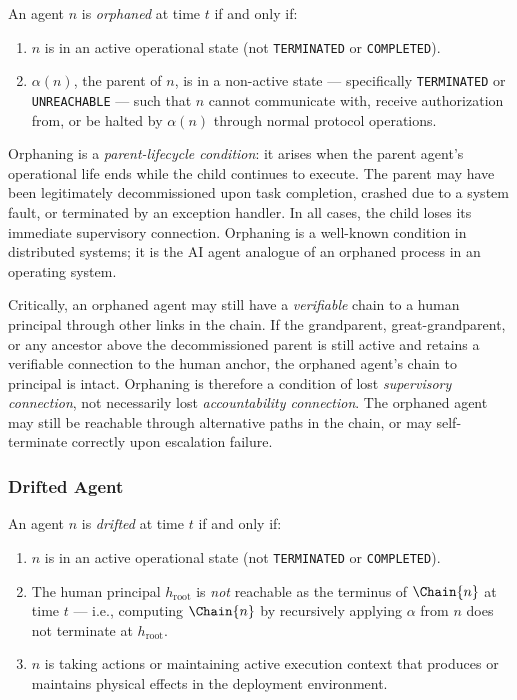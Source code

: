 \begin{dfn}
\label{dfn:orphaned}
An agent $n$ is \emph{orphaned} at time $t$ if and only if:

\begin{enumerate}
    \item[(O1)] $n$ is in an active operational state (not \texttt{TERMINATED} or \texttt{COMPLETED}).
    \item[(O2)] $\alpha(n)$, the parent of $n$, is in a non-active state — specifically \texttt{TERMINATED} or \texttt{UNREACHABLE} — such that $n$ cannot communicate with, receive authorization from, or be halted by $\alpha(n)$ through normal protocol operations.
\end{enumerate}
\end{dfn}

Orphaning is a \emph{parent-lifecycle condition}: it arises when the parent agent's operational life ends while the child continues to execute. The parent may have been legitimately decommissioned upon task completion, crashed due to a system fault, or terminated by an exception handler. In all cases, the child loses its immediate supervisory connection. Orphaning is a well-known condition in distributed systems; it is the AI agent analogue of an orphaned process in an operating system.

Critically, an orphaned agent may still have a \emph{verifiable} chain to a human principal through other links in the chain. If the grandparent, great-grandparent, or any ancestor above the decommissioned parent is still active and retains a verifiable connection to the human anchor, the orphaned agent's chain to principal is intact. Orphaning is therefore a condition of lost \emph{supervisory connection}, not necessarily lost \emph{accountability connection}. The orphaned agent may still be reachable through alternative paths in the chain, or may self-terminate correctly upon escalation failure.

\subsubsection{Drifted Agent}
\label{sec:drifted-agent}

\begin{dfn}
\label{dfn:drifted}
An agent $n$ is \emph{drifted} at time $t$ if and only if:

\begin{enumerate}
    \item[(D1)] $n$ is in an active operational state (not \texttt{TERMINATED} or \texttt{COMPLETED}).
    \item[(D2)] The human principal $h_{\text{root}}$ is \emph{not} reachable as the terminus of $\Chain{n}$ at time $t$ — i.e., computing $\Chain{n}$ by recursively applying $\alpha$ from $n$ does not terminate at $h_{\text{root}}$.
    \item[(D3)] $n$ is taking actions or maintaining active execution context that produces or maintains physical effects in the deployment environment.
\end{enumerate}
\end{dfn}

